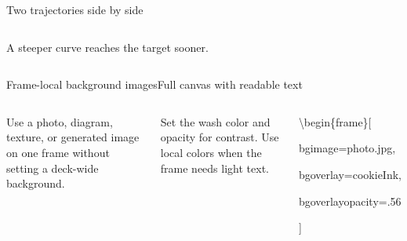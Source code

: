 \documentclass[aspectratio=169]{beamer}
\begin{document}
\begin{frame}{Two trajectories side by side}
\begin{columns}[T,onlytextwidth]
\begin{cookiecard}[title=Minimum time]
        \vspace{.35em}
        \footnotesize A steeper curve reaches the target sooner.
      \end{cookiecard}
  \end{columns}
\end{frame}

{
\begin{frame}[
  bgimage=assets/cookie-background.png,
  bgfit=cover,
  bgoverlay=cookieInk,
  bgoverlayopacity=.56
]{Frame-local background images}{Full canvas with readable text}
  \color{white}
  \begin{columns}[T,onlytextwidth]
      \Large
      Use a photo, diagram, texture, or generated image on one frame without setting a deck-wide background.

      \vspace{.8em}
      \normalsize
      Set the wash color and opacity for contrast. Use local colors when the frame needs light text.

      \begin{cookiecard}[title=Frame syntax]
        \ttfamily\small
        \textbackslash begin\{frame\}[\par
        \quad bgimage=photo.jpg,\par
        \quad bgoverlay=cookieInk,\par
        \quad bgoverlayopacity=.56\par
        ]
      \end{cookiecard}
  \end{columns}
\end{frame}
}
\end{document}
